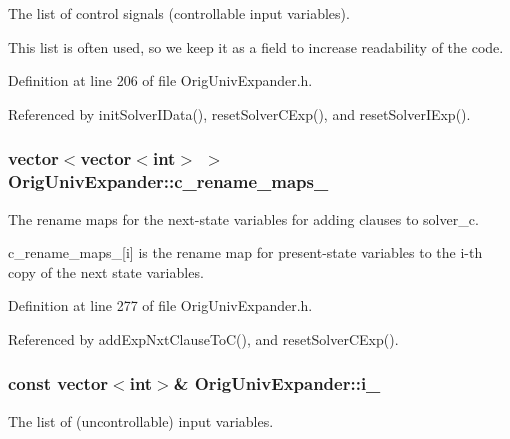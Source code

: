 The list of control signals (controllable input variables). 

This list is often used, so we keep it as a field to increase readability of the code. 

Definition at line 206 of file Orig\-Univ\-Expander.\-h.



Referenced by init\-Solver\-I\-Data(), reset\-Solver\-C\-Exp(), and reset\-Solver\-I\-Exp().

\hypertarget{classOrigUnivExpander_a88ffdcc269b3e72eae24c6744b412b4e}{
\subsubsection[{c\-\_\-rename\-\_\-maps\-\_\-}]{\setlength{\rightskip}{0pt plus 5cm}vector$<$vector$<$int$>$ $>$ Orig\-Univ\-Expander\-::c\-\_\-rename\-\_\-maps\-\_\-\hspace{0.3cm}{\ttfamily [protected]}}}\label{classOrigUnivExpander_a88ffdcc269b3e72eae24c6744b412b4e}


The rename maps for the next-\/state variables for adding clauses to solver\-\_\-c. 

c\-\_\-rename\-\_\-maps\-\_\-\mbox{[}i\mbox{]} is the rename map for present-\/state variables to the i-\/th copy of the next state variables. 

Definition at line 277 of file Orig\-Univ\-Expander.\-h.



Referenced by add\-Exp\-Nxt\-Clause\-To\-C(), and reset\-Solver\-C\-Exp().

\hypertarget{classOrigUnivExpander_a1e2e61937364c1f6ae1113c3bee359ab}{
\subsubsection[{i\-\_\-}]{\setlength{\rightskip}{0pt plus 5cm}const vector$<$int$>$\& Orig\-Univ\-Expander\-::i\-\_\-\hspace{0.3cm}{\ttfamily [protected]}}}\label{classOrigUnivExpander_a1e2e61937364c1f6ae1113c3bee359ab}


The list of (uncontrollable) input variables. 

